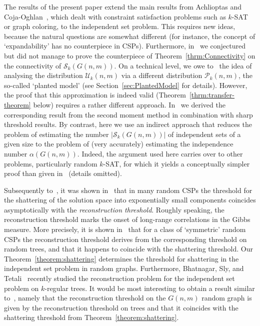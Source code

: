 \documentclass[a4paper,10pt]{article}
\newcommand\cU{\mathcal{U}}
\newcommand\cS{\mathcal{S}}
\newcommand\cP{\mathcal{P}}
\newcommand\Thm{Theorem}
\newcommand\Sec{Section}
\begin{document}
The results of the present paper extend the main results from Achlioptas
and Coja-Oghlan~\cite{AchCoOg}, which dealt with constraint satisfaction
problems such as $k$-SAT or graph coloring, to the independent set
problem. This requires new ideas, because the natural questions are
somewhat different (for instance, the concept of `expandability'
has no counterpiece in CSPs). Furthermore, in~\cite{AchCoOg} we
conjectured but did not manage to prove the counterpiece of
\Thm~\ref{thrm:Connectivity} on the connectivity of $\cS_k(G(n,m))$.
On a technical level, we owe to~\cite{AchCoOg} the idea of analysing
the distribution $\cU_k(n,m)$ via a different distribution $\cP_k(n,m)$,
the so-called `planted model' (see \Sec~\ref{sec:PlantedModel}
for details). However, the proof that this approximation is indeed
valid (\Thm~\ref{thrm:transfer-theorem} below) requires a rather
different approach. In~\cite{AchCoOg} we derived the corresponding
result from the second moment method in combination with sharp
threshold results. By contrast, here we use an indirect approach
that reduces the problem of estimating the number $|\cS_k(G(n,m))|$
of independent sets of a given size to the problem of (very accurately)
estimating the independence number $\alpha(G(n,m))$. Indeed, the
argument used here carries over to other problems, particularly
random $k$-SAT, for which it yields a conceptually simpler proof
than given in~\cite{AchCoOg} (details omitted).

Subsequently to~\cite{AchCoOg}, it was shown in~\cite{MRT} that
in many random CSPs the threshold for the shattering of the solution
space into exponentially small components coincides asymptotically
with the \emph{reconstruction threshold}. Roughly speaking, the
reconstruction threshold marks the onset of long-range correlations
in the Gibbs measure. More precisely, it is shown in~\cite{MRT} that
for a class of `symmetric' random CSPs the reconstruction threshold
derives from the corresponding threshold on random trees, and that
it happens to coincide with the shattering threshold. Our
\Thm~\ref{theorem:shattering} determines the threshold for shattering
in the independent set problem in random graphs. Furthermore,
Bhatnagar, Sly, and Tetali~\cite{BST10} recently studied the
reconstruction problem for the independent set problem on $k$-regular
trees. It would be most interesting to obtain a result
similar to~\cite{MRT}, namely that the reconstruction threshold
on the $G(n,m)$ random graph is given by the reconstruction threshold
on trees and that it coincides with the shattering threshold from
\Thm~\ref{theorem:shattering}.
\end{document}
